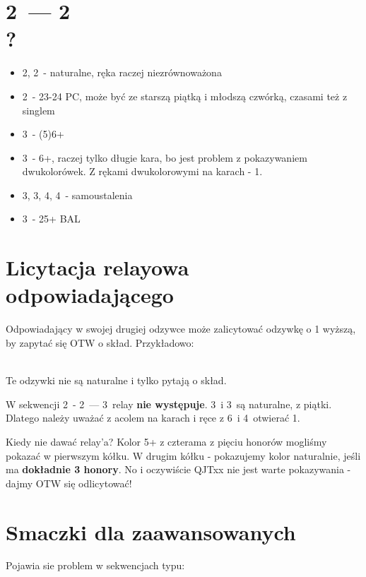 \documentclass[12pt, a4paper]{article}
\begin{document}
\pagebreak
\section{2\clubs\ --- 2\diams \\ ?}
\begin{itemize}
    \item 2\hearts, 2\spades\ - naturalne, ręka raczej niezrównoważona
    \item 2\nt\ - 23-24 PC, może być ze starszą piątką i młodszą czwórką, czasami też z singlem
    \item 3\clubs\ - (5)6+\clubs
    \item 3\diams\ - 6+\diams, raczej tylko długie kara, bo jest problem z pokazywaniem dwukolorówek. 
    Z rękami dwukolorowymi na karach - 1\diams.
    \item 3\hearts, 3\spades, 4\clubs, 4\diams\ - samoustalenia
    \item 3\nt\ - 25+ BAL
\end{itemize}

\section{Licytacja relayowa odpowiadającego}
\raggedright
Odpowiadający w swojej drugiej odzywce może zalicytować odzywkę o 1 wyższą, by zapytać się OTW o skład.
Przykładowo: \\[1em]
\webidding{
    2\clubs & 2\diams \\
    2\hearts & \conventional{2\spades}
}
\webidding{
    2\clubs & 2\diams \\
    2\spades & \conventional{2\ntx}
} \\[1em]
\raggedright
Te odzywki nie są naturalne i tylko pytają o skład.

\begin{formal}
    W sekwencji 2\clubs\ - 2\diams\ --- 3\diams\ relay \textbf{nie występuje}. 3\hearts\ i 3\spades\ są naturalne,
    z piątki. Dlatego należy uważać z acolem na karach i ręce z 6\diams\ i 4\major\ otwierać 1\diams.
\end{formal}

Kiedy nie dawać relay'a? Kolor 5+ z czterama z pięciu honorów mogliśmy pokazać w pierwszym kółku.
W drugim kółku - pokazujemy kolor naturalnie, jeśli ma \textbf{dokładnie 3 honory}. No i oczywiście
QJTxx nie jest warte pokazywania - dajmy OTW się odlicytować!

\pagebreak
\section{Smaczki dla zaawansowanych}
\raggedright
Pojawia sie problem w sekwencjach typu: \\[1em]
\end{document}

